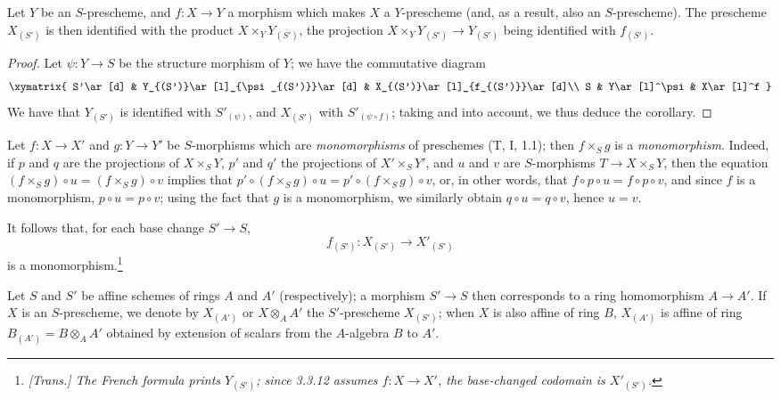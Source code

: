 \begin{corollary}[3.3.11]
\label{I.3.3.11}
Let $Y$ be an $S$-prescheme, and $f:X\to Y$ a morphism which makes $X$ a
$Y$-prescheme (and, as a result, also an $S$-prescheme). The prescheme $X_{(S')}$
is then identified with the product $X\times_Y Y_{(S')}$, the projection
$X\times_Y Y_{(S')}\to Y_{(S')}$ being identified with $f_{(S')}$.
\end{corollary}

\begin{proof}
Let $\psi:Y\to S$ be the structure morphism of $Y$; we have the commutative
diagram
\[
  \xymatrix{
    S'\ar[d] &
    Y_{(S')}\ar[l]_{\psi_{(S')}}\ar[d] &
    X_{(S')}\ar[l]_{f_{(S')}}\ar[d]\\
    S &
    Y\ar[l]^\psi &
    X\ar[l]^f
  }
\]
We have that $Y_{(S')}$ is identified with $S'_{(\psi)}$, and $X_{(S')}$ with
$S'_{(\psi\circ f)}$; taking  and
 into account, we thus deduce the corollary.
\end{proof}

\begin{env}[3.3.12]
\label{I.3.3.12}
Let $f:X\to X'$ and $g:Y\to Y'$ be $S$-morphisms which are \emph{monomorphisms}
of preschemes (T, I, 1.1); then $f\times_S g$ is a \emph{monomorphism}. Indeed,
if $p$ and $q$ are the projections of $X\times_S Y$, $p'$ and $q'$ the projections of
$X'\times_S Y'$, and $u$ and $v$ are $S$-morphisms $T\to X\times_S Y$, then the
equation $(f\times_S g)\circ u=(f\times_S g)\circ v$ implies that
$p'\circ(f\times_S g)\circ u=p'\circ(f\times_S g)\circ v$, or, in other words, that
$f\circ p\circ u=f\circ p\circ v$, and since $f$ is a monomorphism,
$p\circ u=p\circ v$; using the fact that $g$ is a monomorphism, we similarly
obtain $q\circ u=q\circ v$, hence $u=v$.

It follows that, for each base change $S'\to S$,
\[
  f_{(S')}:X_{(S')}\to X'_{(S')}
\]
is a monomorphism.\footnote{\emph{[Trans.] The French formula prints
$Y_{(S')}$; since 3.3.12 assumes $f:X\to X'$, the base-changed codomain is
$X'_{(S')}$.}}
\end{env}

\begin{env}[3.3.13]
\label{I.3.3.13}
Let $S$ and $S'$ be affine schemes of rings $A$ and $A'$ (respectively); a morphism
$S'\to S$ then corresponds to a ring homomorphism $A\to A'$. If $X$ is an
$S$-prescheme, we denote by $X_{(A')}$ or $X\otimes_A A'$ the $S'$-prescheme
$X_{(S')}$; when $X$ is also affine of ring $B$, $X_{(A')}$ is affine of ring
$B_{(A')}=B\otimes_A A'$ obtained by extension of scalars from the $A$-algebra
$B$ to $A'$.
\end{env}

